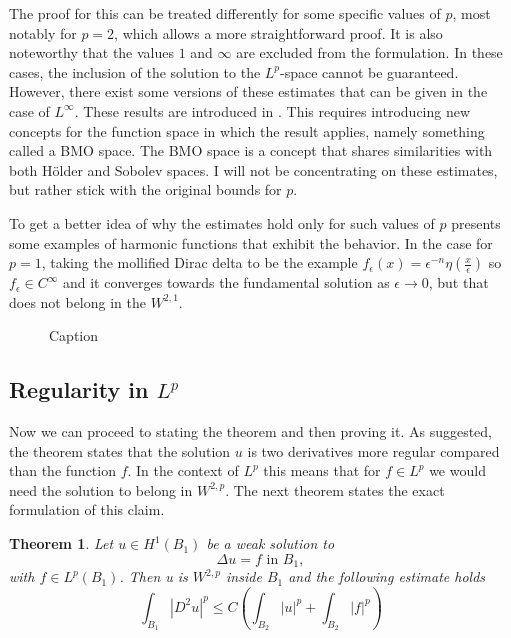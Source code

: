\documentclass[12pt]{artikel1}
\newtheorem{theorem}{Theorem}[section]
\begin{document}
\noindent The proof for this can be treated differently for some specific values of $p$, most notably for $p=2$, which allows a more straightforward proof. It is also noteworthy that the values $1$ and $\infty$ are excluded from the formulation. In these cases, the inclusion of the solution to the $L^p$-space cannot be guaranteed. However, there exist some versions of these estimates that can be given in the case of $L^\infty$. These results are introduced in \cite{sanpera}. This requires introducing new concepts for the function space in which the result applies, namely something called a BMO space. The BMO space is a concept that shares similarities with both Hölder and Sobolev spaces. I will not be concentrating on these estimates, but rather stick with the original bounds for $p$.

To get a better idea of why the estimates hold only for such values of $p$ \cite{Fern_ndez_Real_2022} presents some examples of harmonic functions that exhibit the behavior. In the case for $p=1$, taking the mollified Dirac delta to be the example $f_\epsilon(x)=\epsilon^{-n}\eta(\frac{x}{\epsilon})$ so $f_\epsilon\in C^{\infty}$ and it converges towards the fundamental solution as $\epsilon\rightarrow0$, but that does not belong in the $W^{2,1}$.

\begin{figure}[h]
    \centering
    
    \caption{Caption}
    \label{fig:failure}
\end{figure}

\subsection*{Regularity in $L^p$}

Now we can proceed to stating the theorem and then proving it. As suggested, the theorem states that the solution $u$ is two derivatives more regular compared than the function $f$. In the context of $L^p$ this means that for $f\in L^p$ we would need the solution to belong in $W^{2,p}$. The next theorem states the exact formulation of this claim.

\begin{theorem}\label{thm:main}
    Let $u\in H^1(B_1)$ be a weak solution to
    \begin{equation*}
        \Delta u=f\text{ in }B_1,
    \end{equation*}
    with $f\in L^p(B_1)$. Then u is $W^{2,p}$ inside $B_1$ and the following estimate holds
    \begin{equation*}
        \int_{B_1}|D^2u|^p\leq C\left(\int_{B_2}|u|^p+\int_{B_2}|f|^p\right)
    \end{equation*}
\end{theorem}
\end{document}
